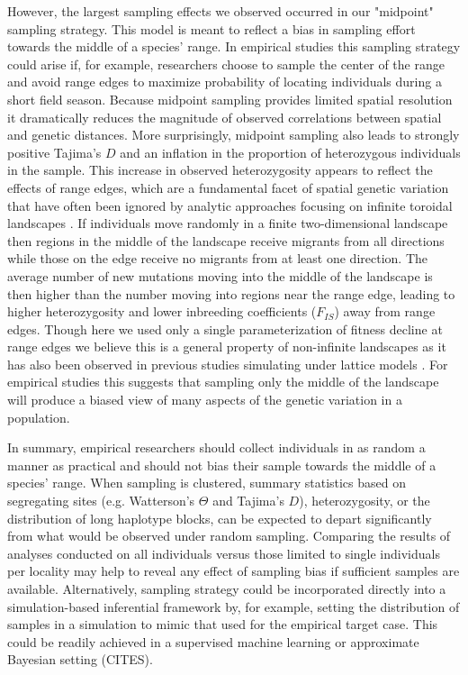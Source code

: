 \documentclass[11pt,twoside,lineno]{preprint}
\begin{document}
However, the largest sampling effects we observed occurred in our "midpoint" sampling strategy. This model is meant to reflect a bias in sampling effort towards the middle of a species' range. In empirical studies this sampling strategy could arise if, for example, researchers choose to sample the center of the range and avoid range edges to maximize probability of locating individuals during a short field season. Because midpoint sampling provides limited spatial resolution it dramatically reduces the magnitude of observed correlations between spatial and genetic distances. More surprisingly, midpoint sampling also leads to strongly positive Tajima's $D$ and an inflation in the proportion of heterozygous individuals in the sample. This increase in observed heterozygosity appears to reflect the effects of range edges, which are a fundamental facet of spatial genetic variation that have often been ignored by analytic approaches focusing on infinite toroidal landscapes \citep{Felsenstein1975}. If individuals move randomly in a finite two-dimensional landscape then regions in the middle of the landscape receive migrants from all directions while those on the edge receive no migrants from at least one direction. The average number of new mutations moving into the middle of the landscape is then higher than the number moving into regions near the range edge, leading to higher heterozygosity and lower inbreeding coefficients ($F_{IS}$) away from range edges. Though here we used only a single parameterization of fitness decline at range edges we believe this is a general property of non-infinite landscapes as it has also been observed in previous studies simulating under lattice models \citep{Neel2013,Shirk2014}. For empirical studies this suggests that sampling only the middle of the landscape will produce a biased view of many aspects of the genetic variation in a population. 

In summary, empirical researchers should collect individuals in as random a manner as practical and should not bias their sample towards the middle of a species' range. When sampling is clustered, summary statistics based on segregating sites (e.g. Watterson's $\Theta$ and Tajima's $D$), heterozygosity, or the distribution of long haplotype blocks, can be expected to depart significantly from what would be observed under random sampling. Comparing the results of analyses conducted on all individuals versus those limited to single individuals per locality may help to reveal any effect of sampling bias if sufficient samples are available. Alternatively, sampling strategy could be incorporated directly into a simulation-based inferential framework by, for example, setting the  distribution of samples in a simulation to mimic that used for the empirical target case. This could be readily achieved in a supervised machine learning or approximate Bayesian setting (CITES).
\end{document}
